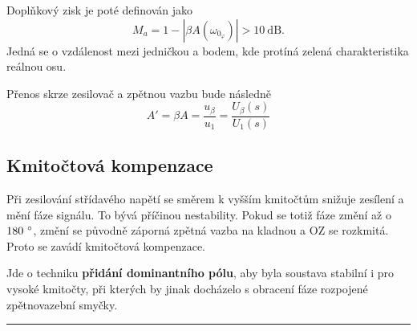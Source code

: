 \documentclass[a4paper,12pt]{article}   %
\begin{document}
Doplňkový zisk je poté definován jako
\begin{equation*}
    M_a = 1-|\beta A(\omega_{0_\varphi})| > 10~\text{dB}.
\end{equation*}
Jedná se o vzdálenost mezi jedničkou a bodem, kde protíná zelená charakteristika reálnou osu.

Přenos skrze zesilovač a zpětnou vazbu bude následně
\begin{equation*}
    A' = \beta A = \frac{u_\beta}{u_\text{1}} = \frac{U_\beta (s)}{U_\text{1}(s)}
\end{equation*}

\subsection*{Kmitočtová kompenzace}
Při zesilování střídavého napětí se směrem k vyšším kmitočtům snižuje zesílení a mění fáze signálu. To bývá příčinou nestability. Pokud se totiž fáze změní až o $180~\degree$, změní se původně záporná zpětná vazba na kladnou a OZ se rozkmitá. Proto se zavádí kmitočtová kompenzace.

Jde o techniku \textbf{přidání dominantního pólu}, aby byla soustava stabilní i pro vysoké kmitočty, při kterých by jinak docházelo s obracení fáze rozpojené zpětnovazební smyčky.
\\
\hrule%








\newpage
\end{document}
